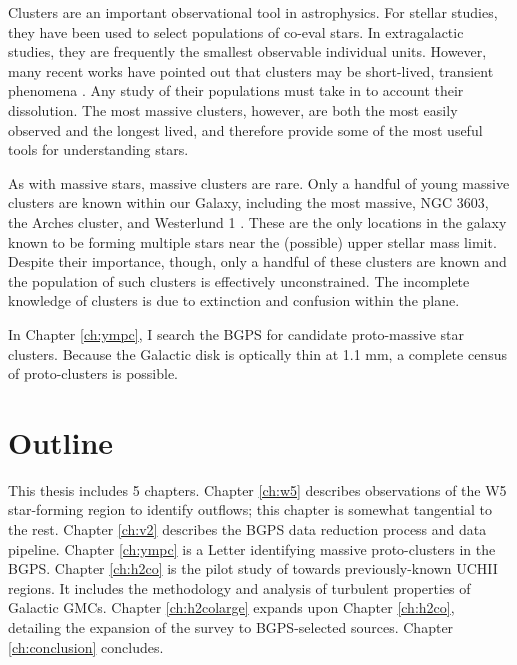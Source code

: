 Clusters are an important observational tool in astrophysics.  For stellar
studies, they have been used to select populations of co-eval stars.  In
extragalactic studies, they are frequently the smallest observable individual
units.  However, many recent works have pointed out that clusters may be
short-lived, transient phenomena
\citep{Kruijssen2011a,Whitehead2013a,Gieles2011a,Whitmore2009a}.  Any study of
their populations must take in to account their dissolution.  The most massive
clusters, however, are both the most easily observed and the longest lived, and
therefore provide some of the most useful tools for understanding stars.

As with massive stars, massive clusters are rare.  Only a handful of young
massive clusters are known within our Galaxy, including the most massive,  NGC
3603, the Arches cluster, and Westerlund 1 \citep{PortegiesZwart2010}.  These
are the only locations in the galaxy known to be forming multiple stars near
the (possible) upper stellar mass limit.  Despite their importance, though,
only a handful of these clusters are known and the population of such clusters
is effectively unconstrained.  The incomplete knowledge of clusters is due to
extinction and confusion within the plane.

In Chapter \ref{ch:ympc}, I search the BGPS for candidate proto-massive star
clusters.  Because the Galactic disk is optically thin at 1.1 mm, a complete
census of proto-clusters is possible.  


\section{Outline}
This thesis includes 5 chapters.
Chapter \ref{ch:w5} describes observations of the W5 star-forming region to identify outflows;
this chapter is somewhat tangential to the rest.
Chapter \ref{ch:v2} describes the BGPS data reduction process and data pipeline.
Chapter \ref{ch:ympc} is a Letter identifying massive proto-clusters in the BGPS.
Chapter \ref{ch:h2co} is the pilot study of \formaldehyde towards previously-known UCHII regions.
It includes the methodology and analysis of turbulent properties of Galactic GMCs.
Chapter \ref{ch:h2colarge} expands upon Chapter \ref{ch:h2co}, detailing the expansion of the \formaldehyde survey
to BGPS-selected sources.
Chapter \ref{ch:conclusion} concludes.



